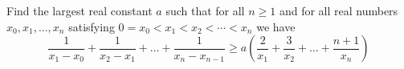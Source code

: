 Find the largest real constant 
$a$
 such that for all 
$n \geq 1$
 and for all real numbers 
$x_0, x_1, ... , x_n$
 satisfying 
$0 = x_0 < x_1 < x_2 < \cdots < x_n$
 we have
\[\frac{1}{x_1-x_0} + \frac{1}{x_2-x_1} + \dots + \frac{1}{x_n-x_{n-1}} \geq a \left( \frac{2}{x_1} + \frac{3}{x_2} + \dots + \frac{n+1}{x_n} \right)\]
